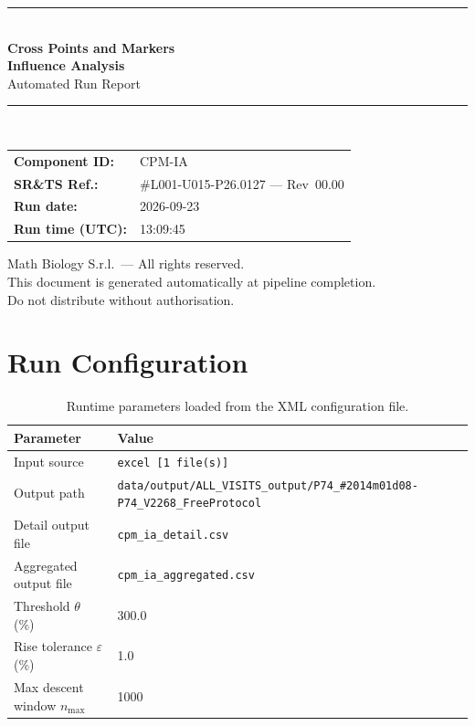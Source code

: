 \documentclass[a4paper,11pt]{article}
\begin{document}
\begin{titlepage}
\begin{center}
  \vspace*{1.8cm}
  {\color{dmaaccent}\rule{\linewidth}{1.5pt}}\\[0.6cm]
  {\LARGE\bfseries\color{dmaaccent}
    Cross Points and Markers\\[0.25cm]
    Influence Analysis}\\[0.4cm]
  {\Large Automated Run Report}\\[0.3cm]
  {\color{dmaaccent}\rule{\linewidth}{1.5pt}}\\[2cm]

  \begin{tabular}{ll}
    \textbf{Component ID:}   & CPM-IA \\[0.3cm]
    \textbf{SR\&TS Ref.:}    & \#L001-U015-P26.0127 --- Rev~00.00 \\[0.3cm]
    \textbf{Run date:}       & 2026-09-23 \\[0.3cm]
    \textbf{Run time (UTC):} & 13:09:45 \\
  \end{tabular}

  \vfill
  {\color{dmagray}\small
    Math Biology S.r.l.\ --- All rights reserved.\\
    This document is generated automatically at pipeline completion.\\
    Do not distribute without authorisation.}
\end{center}
\end{titlepage}

\tableofcontents
\clearpage

\section{Run Configuration}

\begin{table}[h!]
\centering
\small
\caption{Runtime parameters loaded from the XML configuration file.}
\begin{tabular}{ll}
\toprule
\textbf{Parameter} & \textbf{Value} \\
\midrule
Input source                      & \texttt{excel [1 file(s)]} \\
Output path                       & \texttt{data/output/ALL\_VISITS\_output/P74\_\#2014m01d08-P74\_V2268\_FreeProtocol} \\
Detail output file                & \texttt{cpm\_ia\_detail.csv} \\
Aggregated output file            & \texttt{cpm\_ia\_aggregated.csv} \\
Threshold $\theta$ (\%)           & 300.0 \\
Rise tolerance $\varepsilon$ (\%) & 1.0 \\
Max descent window $n_{\max}$     & 1000 \\
\bottomrule
\end{tabular}
\end{table}
\end{document}
